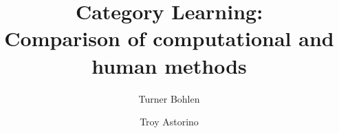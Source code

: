 \documentclass[12pt]{article}
\title{Category Learning: \\Comparison of computational and human methods}
\author{Turner Bohlen \and Troy Astorino}
\begin{document}
\maketitle
\newpage








\nocite{*}


\end{document}
